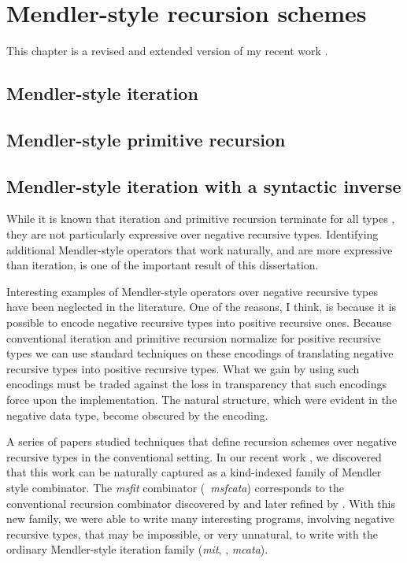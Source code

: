 \chapter{Mendler-style recursion schemes}\label{ch:mendler}

This chapter is a revised and extended version of
my recent work \cite{AhnShe11}.




\section{Mendler-style iteration} \label{sec:mit}


\section{Mendler-style primitive recursion} \label{sec:mpr}

\section{Mendler-style iteration with a syntactic inverse} \label{sec:msf}

While it is known that iteration and primitive recursion terminate for all types
\cite{AbeMatUus05,AbeMat04}, they are not particularly expressive over negative
recursive types. Identifying additional Mendler-style operators that work
naturally, and are more expressive than iteration, is one of the important
result of this dissertation.

Interesting examples of Mendler-style operators over negative recursive types
have been neglected in the literature. One of the reasons, I think, is because
it is possible to encode negative recursive types into positive recursive ones.
Because conventional iteration and primitive recursion normalize for
positive recursive types we can use standard techniques on these encodings
of translating negative recursive types into positive recursive types.
What we gain by using such encodings must be traded against the loss in
transparency that such encodings force upon the implementation. The natural
structure, which were evident in the negative data type, become obscured by
the encoding.

A series of papers \cite{Pat93,MeiHut95,FegShe96,DesPfeSch97,bgb} studied 
techniques that define recursion schemes over negative recursive types in
the conventional setting. In our recent work \cite{AhnShe11}, we discovered
that this work can be naturally captured as a kind-indexed family of Mendler
style combinator. The \textit{msfit} combinator (\aka\ \textit{msfcata})
corresponds to the conventional recursion combinator discovered
by \citet{FegShe96} and later refined by \citet{bgb}.
With this new family, we were able to write many interesting programs,
involving negative recursive types, that may be impossible, or very unnatural,
to write with the ordinary Mendler-style iteration family (\textit{mit},
\aka, \textit{mcata}).


